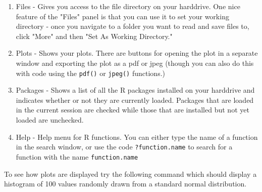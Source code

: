 \documentclass{tufte-book}\usepackage[]{graphicx}\usepackage[]{color}
\begin{document}
\begin{enumerate}
\item Files - Gives you access to the file directory on your harddrive. One nice feature of the "Files" panel is that you can use it to set your working directory - once you navigate to a folder you want to read and save files to, click "More" and then "Set As Working Directory."
\item Plots - Shows your plots. There are buttons for opening the plot in a separate window and exporting the plot as a pdf or jpeg (though you can also do this with code using the \texttt{pdf()} or \texttt{jpeg()} functions.)
\item Packages - Shows a list of all the R packages installed on your harddrive and indicates whether or not they are currently loaded. Packages that are loaded in the current session are checked while those that are installed but not yet loaded are unchecked.
\item Help - Help menu for R functions. You can either type the name of a function in the search window, or use the code \texttt{?function.name} to search for a function with the name \texttt{function.name}
\end{enumerate}


To see how plots are displayed try the following command which should display a histogram of 100 values randomly drawn from a standard normal distribution.
\end{document}
